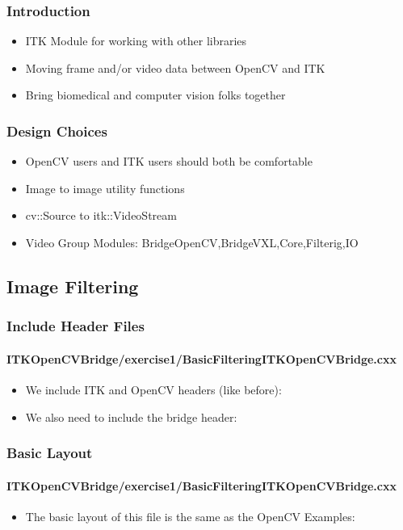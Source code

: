 \begin{frame}
\frametitle{Introduction}
\begin{itemize}
\item ITK Module for working with other libraries
\item Moving frame and/or video data between OpenCV and ITK
\item Bring biomedical and computer vision folks together
\end{itemize}
\end{frame}



\begin{frame}
\frametitle{Design Choices}
\begin{itemize}
\item OpenCV users and ITK users should both be comfortable
\item Image to image utility functions
\item cv::Source to itk::VideoStream
\item Video Group Modules: BridgeOpenCV,BridgeVXL,Core,Filterig,IO
\end{itemize}
\end{frame}

\subsection{Image Filtering}


\begin{frame}
\frametitle{Include Header Files}
\framesubtitle{ITKOpenCVBridge/exercise1/BasicFilteringITKOpenCVBridge.cxx}
\begin{itemize}
\item We include ITK and OpenCV headers (like before):
\item We also need to include the bridge header:
\end{itemize}
\end{frame}

\begin{frame}
\frametitle{Basic Layout}
\framesubtitle{ITKOpenCVBridge/exercise1/BasicFilteringITKOpenCVBridge.cxx}
\begin{itemize}
\item The basic layout of this file is the same as the OpenCV
  Examples:
\end{itemize}
\end{frame}

